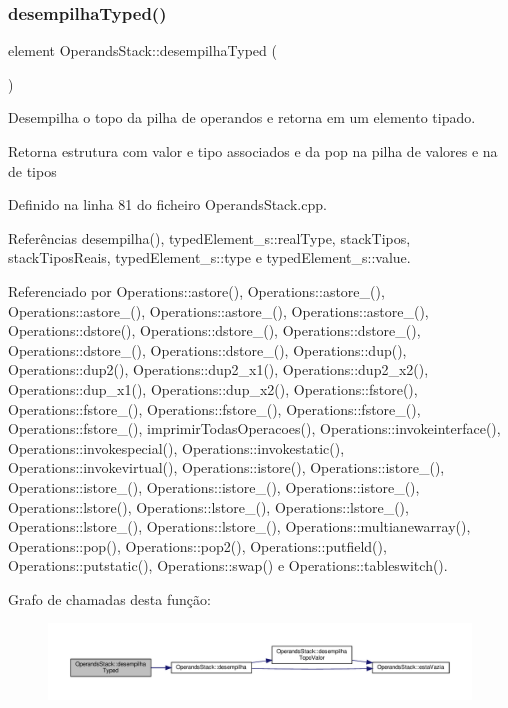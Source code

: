 \subsubsection{\texorpdfstring{desempilha\+Typed()}{desempilhaTyped()}}
{\footnotesize\ttfamily element Operands\+Stack\+::desempilha\+Typed (\begin{DoxyParamCaption}{ }\end{DoxyParamCaption})}



Desempilha o topo da pilha de operandos e retorna em um elemento tipado. 

Retorna estrutura com valor e tipo associados e da pop na pilha de valores e na de tipos 

Definido na linha 81 do ficheiro Operands\+Stack.\+cpp.



Referências desempilha(), typed\+Element\+\_\+s\+::real\+Type, stack\+Tipos, stack\+Tipos\+Reais, typed\+Element\+\_\+s\+::type e typed\+Element\+\_\+s\+::value.



Referenciado por Operations\+::astore(), Operations\+::astore\+\_(), Operations\+::astore\+\_(), Operations\+::astore\+\_(), Operations\+::astore\+\_(), Operations\+::dstore(), Operations\+::dstore\+\_(), Operations\+::dstore\+\_(), Operations\+::dstore\+\_(), Operations\+::dstore\+\_(), Operations\+::dup(), Operations\+::dup2(), Operations\+::dup2\+\_\+x1(), Operations\+::dup2\+\_\+x2(), Operations\+::dup\+\_\+x1(), Operations\+::dup\+\_\+x2(), Operations\+::fstore(), Operations\+::fstore\+\_(), Operations\+::fstore\+\_(), Operations\+::fstore\+\_(), Operations\+::fstore\+\_(), imprimir\+Todas\+Operacoes(), Operations\+::invokeinterface(), Operations\+::invokespecial(), Operations\+::invokestatic(), Operations\+::invokevirtual(), Operations\+::istore(), Operations\+::istore\+\_(), Operations\+::istore\+\_(), Operations\+::istore\+\_(), Operations\+::istore\+\_(), Operations\+::lstore(), Operations\+::lstore\+\_(), Operations\+::lstore\+\_(), Operations\+::lstore\+\_(), Operations\+::lstore\+\_(), Operations\+::multianewarray(), Operations\+::pop(), Operations\+::pop2(), Operations\+::putfield(), Operations\+::putstatic(), Operations\+::swap() e Operations\+::tableswitch().

Grafo de chamadas desta função\+:\nopagebreak
\begin{figure}[H]
\begin{center}
\leavevmode
\includegraphics[width=350pt]{classOperandsStack_a9503313a7def4c11fb782d5881e3d6cb_cgraph}
\end{center}
\end{figure}
\mbox{\label{classOperandsStack_a50b642d5ff6a7a1f56b8cfc75bde1192}} 
